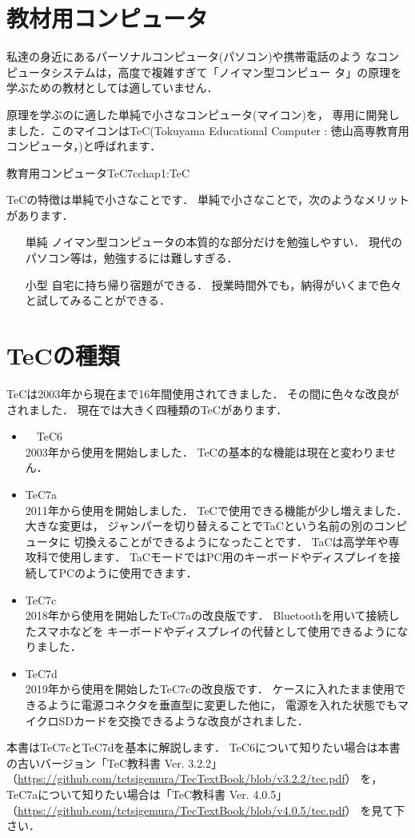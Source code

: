 \section{教材用コンピュータ}

私達の身近にあるパーソナルコンピュータ(パソコン)や携帯電話のよう
なコンピュータシステムは，高度で複雑すぎて「ノイマン型コンピュー
タ」の原理を学ぶための教材としては適していません．

原理を学ぶのに適した単純で小さなコンピュータ(マイコン)を，
専用に開発しました．このマイコンはTeC(Tokuyama Educational
Computer : 徳山高専教育用コンピュータ，)と呼ばれます．

{教育用コンピュータTeC7c}{chap1:TeC}

TeCの特徴は単純で小さなことです．
単純で小さなことで，次のようなメリットがあります．

\begin{itemize}
\item[単純]
ノイマン型コンピュータの本質的な部分だけを勉強しやすい．
現代のパソコン等は，勉強するには難しすぎる．
\item[小型]
自宅に持ち帰り宿題ができる．
授業時間外でも，納得がいくまで色々と試してみることができる．
\end{itemize}

\section{TeCの種類}

TeCは2003年から現在まで16年間使用されてきました．
その間に色々な改良がされました．
現在では大きく四種類のTeCがあります．

\begin{itemize}
\item　TeC6 \\
2003年から使用を開始しました．
TeCの基本的な機能は現在と変わりません．
\item TeC7a \\
2011年から使用を開始しました．
TeCで使用できる機能が少し増えました．
大きな変更は，
ジャンパーを切り替えることでTaCという名前の別のコンピュータに
切換えることができるようになったことです．
TaCは高学年や専攻科で使用します．
TaCモードではPC用のキーボードやディスプレイを接続してPCのように使用できます．
\item TeC7c \\
2018年から使用を開始したTeC7aの改良版です．
Bluetoothを用いて接続したスマホなどを
キーボードやディスプレイの代替として使用できるようになりました．
\item TeC7d \\
2019年から使用を開始したTeC7cの改良版です．
ケースに入れたまま使用できるように電源コネクタを垂直型に変更した他に，
電源を入れた状態でもマイクロSDカードを交換できるような改良がされました．
\end{itemize}

本書はTeC7cとTeC7dを基本に解説します．
TeC6について知りたい場合は本書の古いバージョン「TeC教科書 Ver. 3.2.2」
（\url{https://github.com/tctsigemura/TecTextBook/blob/v3.2.2/tec.pdf}）
を，
TeC7aについて知りたい場合は「TeC教科書 Ver. 4.0.5」
（\url{https://github.com/tctsigemura/TecTextBook/blob/v4.0.5/tec.pdf}）
を見て下さい．
